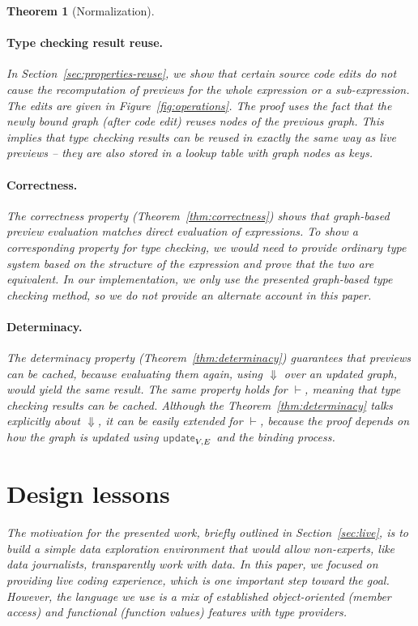 \documentclass[acmsmall,anonymous,fleqn]{acmart}\settopmatter{printfolios=false,printccs=false,printacmref=false}
\newcounter{thc}
\theoremstyle{plain}
\newtheorem{theorem}[thc]{Theorem}
\theoremstyle{definition}
\newcommand{\ident}[1]{\textnormal{\textcolor{idclr}{\sffamily #1}}}
\begin{document}
\begin{theorem}[Normalization]
\paragraph{Type checking result reuse.} In Section~\ref{sec:properties-reuse}, we show that
certain source code edits do not cause the recomputation of previews for the whole expression
or a sub-expression. The edits are given in Figure~\ref{fig:operations}. The proof uses the fact
that the newly bound graph (after code edit) reuses nodes of the previous graph. This implies that
type checking results can be reused in exactly the same way as live previews -- they are also
stored in a lookup table with graph nodes as keys.

\paragraph{Correctness.} The correctness property (Theorem~\ref{thm:correctness}) shows that
graph-based preview evaluation matches direct evaluation of expressions. To show a corresponding
property for type checking, we would need to provide ordinary type system based on the structure
of the expression and prove that the two are equivalent. In our implementation, we only use the
presented graph-based type checking method, so we do not provide an alternate account in this paper.

\paragraph{Determinacy.} The determinacy property (Theorem~\ref{thm:determinacy}) guarantees that
previews can be cached, because evaluating them again, using $\Downarrow$ over an updated graph,
would yield the same result. The same property holds for $\vdash$, meaning that type checking
results can be cached. Although the Theorem~\ref{thm:determinacy} talks explicitly about
$\Downarrow$, it can be easily extended for $\vdash$, because the proof depends on how the graph
is updated using $\ident{update}_{V,E}$ and the binding process.


\section{Design lessons}
\label{sec:design}

The motivation for the presented work, briefly outlined in Section~\ref{sec:live}, is to build a
simple data exploration environment that would allow non-experts, like data journalists,
transparently work with data. In this paper, we focused on providing live coding experience,
which is one important step toward the goal. However, the language we use is a mix of established
object-oriented (member access) and functional (function values) features with type providers.


\end{theorem}
\end{document}
